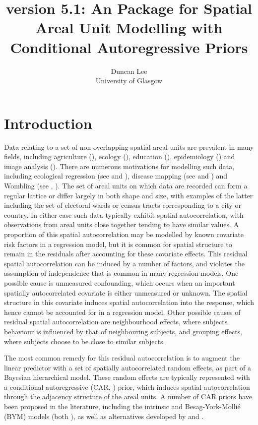 \documentclass[article,shortnames,nojss]{jss}
\author{Duncan Lee\\University of Glasgow }
\title{\pkg{CARBayes} version 5.1: An \proglang{R} Package for Spatial Areal Unit Modelling  with Conditional Autoregressive Priors}
\begin{document}






\section{Introduction}
Data relating to a set of non-overlapping spatial areal units are prevalent in many fields, including agriculture (\cite{besag1999}), ecology (\cite{brewer2007}), education (\cite{wall2004}), epidemiology (\cite{lee2011}) and image analysis (\cite{gavin1997}).  There are numerous motivations for modelling such data, including ecological regression  (see \cite{wakefield2007} and \cite{lee2009}), disease mapping (see \cite{green2002} and \cite{lee2011}) and Wombling (see \cite{lu2007}, \cite{ma2007}). The set of areal units on which data are recorded can form a regular lattice or differ largely in both shape and size, with examples of the latter including the set of electoral wards or census tracts corresponding to a city or country. In either case such data typically exhibit spatial autocorrelation, with observations from areal units close together tending to have similar values. A proportion of this spatial autocorrelation may be modelled by known covariate risk factors in a regression model, but it is common for  spatial structure to remain in the residuals after accounting for these covariate effects. This residual spatial autocorrelation can be induced by a number of factors, and violates the assumption of independence that is common in many regression models. One possible cause is unmeasured confounding, which occurs when an important spatially autocorrelated covariate is either unmeasured or unknown. The spatial structure in this covariate induces spatial autocorrelation into the response, which hence cannot be accounted for in a regression model. Other possible causes of residual spatial autocorrelation are neighbourhood effects, where subjects behaviour is influenced by that of neighbouring subjects, and grouping effects, where subjects choose to be close to similar subjects.

\hspace{1cm} The most common remedy for this residual autocorrelation is to augment the linear predictor with a set of spatially autocorrelated random effects, as part of a Bayesian hierarchical model. These random effects are typically represented with a conditional autoregressive (CAR, \cite{besag1991}) prior,  which induces spatial autocorrelation through the adjacency structure of the areal units. A number of CAR priors have been proposed in the literature, including the intrinsic and Besag-York-Molli\'{e} (BYM) models (both \cite{besag1991}), as well as alternatives  developed by \cite{leroux2000} and \cite{stern1999}. 
\end{document}
